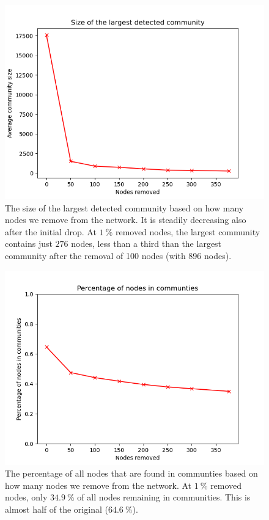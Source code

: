 \documentclass[9pt,twocolumn,twoside]{pnas-new}
\begin{document}
\begin{figure}[!htbp]
    \centering
    \includegraphics[width=1\linewidth]{max_size_2.png}
    \caption{The size of the largest detected community based on how many nodes we remove from the network. It is steadily decreasing also after the initial drop. At $1~\%$ removed nodes, the largest community contains just $276$ nodes, less than a third than the largest community after the removal of 100 nodes (with 896 nodes).
    }
    \label{max_size_2}
\end{figure}

\begin{figure}[!htbp]
    \centering
    \includegraphics[width=1\linewidth]{ratio_2.png}
    \caption{The percentage of all nodes that are found in communties based on how many nodes we remove from the network.
    At $1~\%$ removed nodes, only $34.9~\%$ of all nodes remaining in communities. This is almost half of the original ($64.6~\%$).
    }
    \label{ratio_2}
\end{figure}
\end{document}
